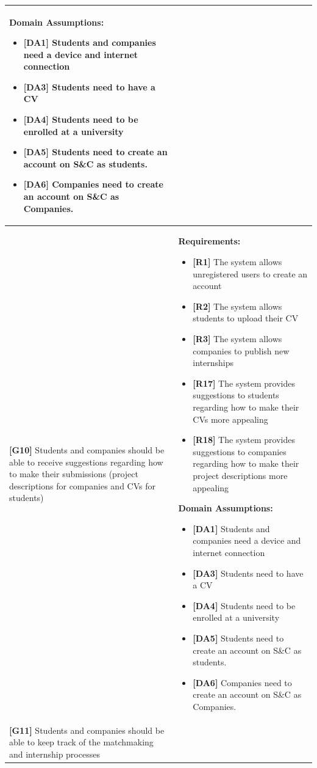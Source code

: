 \begin{longtable}{|p{}|p{}|}
\begin{itemize}
\end{itemize}
\textbf{Domain Assumptions:}
\begin{itemize}
    \item \textbf{[DA1]} Students and companies need a device and internet connection
     \item \textbf{[DA3]} Students need to have a CV
     \item \textbf{[DA4]} Students need to be enrolled at a university
    \item \textbf{[DA5]} Students need to create an account on S\&C as students.
    \item \textbf{[DA6]} Companies need to create an account on S\&C as Companies.
\end{itemize} \\
\hline
\textbf{[G10]} Students and companies should be able to receive suggestions regarding how to make their submissions (project descriptions for companies and CVs for students)
& 
\textbf{Requirements:}
\begin{itemize}
    \item \textbf{[R1]} The system allows unregistered users to create an account
    \item \textbf{[R2]} The system allows students to upload their CV
    \item \textbf{[R3]} The system allows companies to publish new internships
    \item \textbf{[R17]} The system provides suggestions to students regarding how to make their CVs more appealing
    \item \textbf{[R18]} The system provides suggestions to companies regarding how to make their project descriptions more appealing
\end{itemize}
\textbf{Domain Assumptions:}
\begin{itemize}
    \item \textbf{[DA1]} Students and companies need a device and internet connection
     \item \textbf{[DA3]} Students need to have a CV
     \item \textbf{[DA4]} Students need to be enrolled at a university
    \item \textbf{[DA5]} Students need to create an account on S\&C as students.
    \item \textbf{[DA6]} Companies need to create an account on S\&C as Companies.
\end{itemize} \\
\hline
\textbf{[G11]} Students and companies should be able to keep track of the matchmaking and internship processes

\end{longtable}
